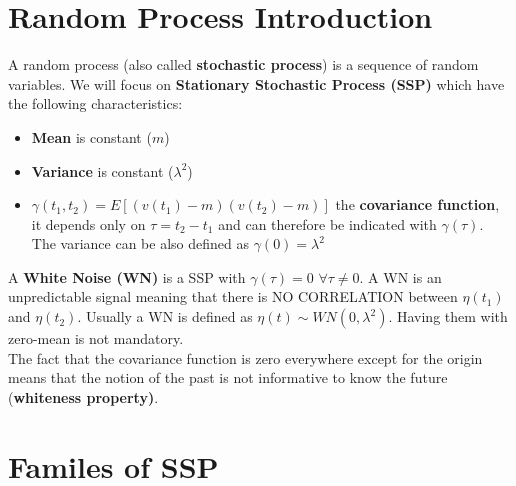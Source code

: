 \documentclass[10pt,a4paper]{article}
\begin{document}
\section{Random Process Introduction}
A random process (also called \textbf{stochastic process}) is a sequence of random variables. We will focus on \textbf{Stationary Stochastic Process (SSP)} which have the following characteristics:
\begin{itemize}
	\item \textbf{Mean} is constant ($m$)
	\item \textbf{Variance} is constant ($\lambda^2$)
	\item $\gamma(t_1,t_2) = E[(v(t_1)-m)(v(t_2)-m)]$ the \textbf{covariance function}, it depends only on $\tau = t_2 - t_1$ and can therefore be indicated with $\gamma(\tau)$. \\ The variance can be also defined as $\gamma(0) = \lambda^2$
\end{itemize}
A \textbf{White Noise (WN)} is a SSP with $\gamma(\tau) = 0$ $\forall \tau \neq 0$. A WN is an unpredictable signal meaning that there is NO CORRELATION between $\eta(t_1)$ and $\eta(t_2)$. Usually a WN is defined as $\eta(t) \sim WN(0,\lambda^2)$. Having them with zero-mean is not mandatory. \\
The fact that the covariance function is zero everywhere except for the origin means that the notion of the past is not informative to know the future (\textbf{whiteness property)}.
\section{Familes of SSP}
\end{document}
